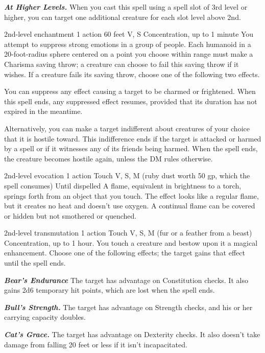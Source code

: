 \documentclass[10pt,twoside,twocolumn,openany]{book}
\newcommand\impact[1]{
	\textbf{\textit{#1}}
}
\begin{document}
\impact{At Higher Levels.} When you cast this spell using a spell slot of 3rd level or higher, you can target one additional creature for each slot level above 2nd.

{2nd-level enchantment}
{\color{action}1 action}
{60 feet}
{V, S}
{{\color{concentration}Concentration}, up to 1 minute}
%
You attempt to suppress strong emotions in a group of people. Each humanoid in a 20-foot-radius sphere centered on a point you choose within range must make a Charisma saving throw; a creature can choose to fail this saving throw if it wishes. If a creature fails its saving throw, choose one of the following two effects.

You can suppress any effect causing a target to be charmed or frightened. When this spell ends, any suppressed effect resumes, provided that its duration has not expired in the meantime.

Alternatively, you can make a target indifferent about creatures of your choice that it is hostile toward. This indifference ends if the target is attacked or harmed by a spell or if it witnesses any of its friends being harmed. When the spell ends, the creature becomes hostile again, unless the DM rules otherwise.

{2nd-level evocation}
{\color{action}1 action}
{Touch}
{V, S, M (ruby dust worth {\color{cost}50 gp}, which the spell consumes)}
{Until dispelled}
%
A flame, equivalent in brightness to a torch, springs forth from an object that you touch. The effect looks like a regular flame, but it creates no heat and doesn't use oxygen. A continual flame can be covered or hidden but not smothered or quenched.

{2nd-level transmutation}
{\color{action}1 action}
{Touch}
{V, S, M (fur or a feather from a beast)}
{{\color{concentration}Concentration}, up to 1 hour.}
%
You touch a creature and bestow upon it a magical enhancement. Choose one of the following effects; the target gains that effect until the spell ends.

\impact{Bear’s Endurance} The target has advantage on Constitution checks. It also gains 2d6 temporary hit points, which are lost when the spell ends.

\impact{Bull's Strength.} The target has advantage on Strength checks, and his or her carrying capacity doubles.

\impact{Cat’s Grace.} The target has advantage on Dexterity checks. It also doesn't take damage from falling 20 feet or less if it isn't incapacitated.
\end{document}
